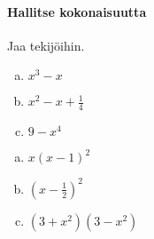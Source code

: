 \paragraph*{Hallitse kokonaisuutta}

\begin{tehtava}
    Jaa tekijöihin.
    \begin{enumerate}[a)]
    	\item $x^3 - x$
        \item $x^2 - x + \frac{1}{4} $
        \item $9-x^4$
    \end{enumerate}
    \begin{vastaus}
        \begin{enumerate}[a)]
            \item $x(x-1)^2$
            \item $(x-\frac{1}{2})^2$
            \item $(3+x^2)(3-x^2)$
        \end{enumerate}
    \end{vastaus}
\end{tehtava}
